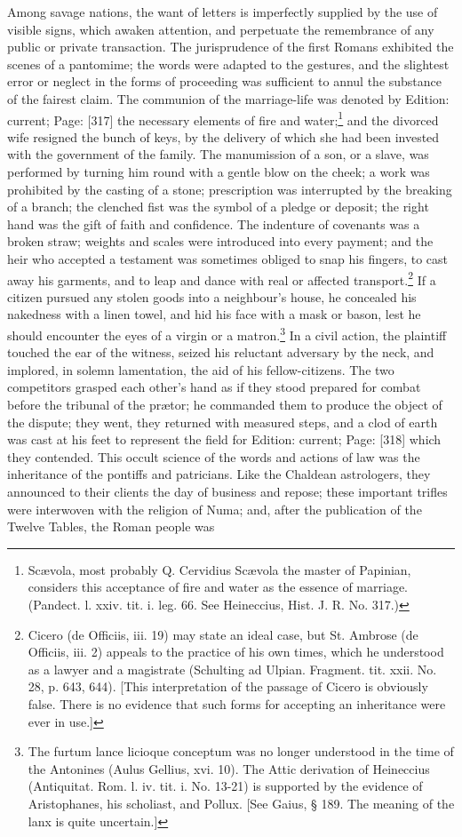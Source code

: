 Among savage nations, the want of letters is imperfectly supplied by the use of visible signs, which awaken attention, and perpetuate the remembrance of any public or private transaction. The jurisprudence of the first Romans exhibited the scenes of a pantomime; the words were adapted to the gestures, and the slightest error or neglect in the forms of proceeding was sufficient to annul the substance of the fairest claim. The communion of the marriage-life was denoted by Edition: current; Page: [317] the necessary elements of fire and water;\footnote{Scævola, most probably Q. Cervidius Scævola the master of Papinian, considers this acceptance of fire and water as the essence of marriage. (Pandect. l. xxiv. tit. i. leg. 66. See Heineccius, Hist. J. R. No. 317.)} and the divorced wife resigned the bunch of keys, by the delivery of which she had been invested with the government of the family. The manumission of a son, or a slave, was performed by turning him round with a gentle blow on the cheek; a work was prohibited by the casting of a stone; prescription was interrupted by the breaking of a branch; the clenched fist was the symbol of a pledge or deposit; the right hand was the gift of faith and confidence. The indenture of covenants was a broken straw; weights and scales were introduced into every payment; and the heir who accepted a testament was sometimes obliged to snap his fingers, to cast away his garments, and to leap and dance with real or affected transport.\footnote{Cicero (de Officiis, iii. 19) may state an ideal case, but St. Ambrose (de Officiis, iii. 2) appeals to the practice of his own times, which he understood as a lawyer and a magistrate (Schulting ad Ulpian. Fragment. tit. xxii. No. 28, p. 643, 644). [This interpretation of the passage of Cicero is obviously false. There is no evidence that such forms for accepting an inheritance were ever in use.]} If a citizen pursued any stolen goods into a neighbour\texthebrew{}’s house, he concealed his nakedness with a linen towel, and hid his face with a mask or bason, lest he should encounter the eyes of a virgin or a matron.\footnote{The furtum lance licioque conceptum was no longer understood in the time of the Antonines (Aulus Gellius, xvi. 10). The Attic derivation of Heineccius (Antiquitat. Rom. l. iv. tit. i. No. 13-21) is supported by the evidence of Aristophanes, his scholiast, and Pollux. [See Gaius, § 189. The meaning of the lanx is quite uncertain.]} In a civil action, the plaintiff touched the ear of the witness, seized his reluctant adversary by the neck, and implored, in solemn lamentation, the aid of his fellow-citizens. The two competitors grasped each other\texthebrew{}’s hand as if they stood prepared for combat before the tribunal of the prætor; he commanded them to produce the object of the dispute; they went, they returned with measured steps, and a clod of earth was cast at his feet to represent the field for Edition: current; Page: [318] which they contended. This occult science of the words and actions of law was the inheritance of the pontiffs and patricians. Like the Chaldean astrologers, they announced to their clients the day of business and repose; these important trifles were interwoven with the religion of Numa; and, after the publication of the Twelve Tables, the Roman people was 